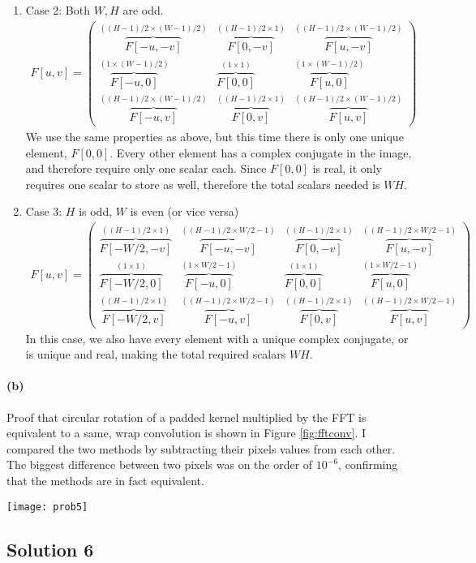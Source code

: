 \documentclass{article}
\newcommand{\solution}[1]{\clearpage \subsection*{Solution #1}}
\newcommand{\spart}[1]{\paragraph{(#1)}}
\begin{document}
\begin{enumerate}
\item Case 2: Both $W,H$ are odd. 
	\begin{align}
		F[u,v] = \left(\begin{array}{c|c|c}
			\overbrace{F[-u,-v]}^{((H-1)/2 \times (W-1)/2)} & \overbrace{F[0,-v]}^{((H-1)/2\times1)} & \overbrace{F[u,-v]}^{((H-1)/2 \times (W-1)/2)}\\ \hline
			\overbrace{F[-u,0]}^{(1 \times (W-1)/2)} & \overbrace{F[0,0]}^{(1\times1)} & \overbrace{F[u,0]}^{(1 \times (W-1)/2)}\\ \hline
			\overbrace{F[-u,v]}^{((H-1)/2 \times (W-1)/2)} & \overbrace{F[0,v]}^{((H-1)/2\times1)} & \overbrace{F[u,v]}^{((H-1)/2 \times (W-1)/2)}
		\end{array} \right)
	\end{align}
We use the same properties as above, but this time there is only one unique element, $F[0,0]$. Every other element has a complex conjugate in the image, and therefore require only one scalar each. Since $F[0,0]$ is real, it only requires one scalar to store as well, therefore the total scalars needed is $WH$.
\item Case 3: $H$ is odd, $W$ is even (or vice versa)
\begin{align}
	F[u,v] = \left(\begin{array}{c|c|c|c}
		\overbrace{F[-W/2,-v]}^{((H-1)/2\times1)} & \overbrace{F[-u,-v]}^{((H-1)/2 \times W/2-1)} & \overbrace{F[0,-v]}^{((H-1)/2\times1)} & \overbrace{F[u,-v]}^{((H-1)/2 \times W/2-1)}\\ \hline
		\overbrace{F[-W/2,0]}^{(1\times1)} & \overbrace{F[-u,0]}^{(1 \times W/2-1)} & \overbrace{F[0,0]}^{(1\times1)} & \overbrace{F[u,0]}^{(1 \times W/2-1)}\\ \hline
		\overbrace{F[-W/2,v]}^{((H-1)/2\times1)} & \overbrace{F[-u,v]}^{((H-1)/2 \times W/2-1)} & \overbrace{F[0,v]}^{((H-1)/2\times1)} & \overbrace{F[u,v]}^{((H-1)/2 \times W/2-1)}
	\end{array} \right)
\end{align}
In this case, we also have every element with a unique complex conjugate, or is unique and real, making the total required scalars $WH$.
\end{enumerate}
\newpage
\spart{b} Proof that circular rotation of a padded kernel multiplied by the FFT is equivalent to a same, wrap convolution is shown in Figure \ref{fig:fftconv}. I compared the two methods by subtracting their pixels values from each other. The biggest difference between two pixels was on the order of $10^{-6}$, confirming that the methods are in fact equivalent.
\begin{figure*}[!h]
	\centering
	\texttt{[image: prob5]}
	\caption{Original Image (left) and Equivalent Convolution and FFT Multiplication Images (center and right)}
	\label{fig:fftconv}
\end{figure*}
\solution{6}
\end{document}
